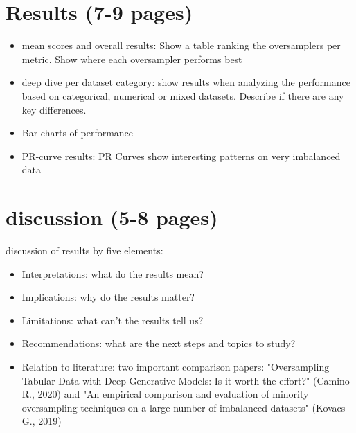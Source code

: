 \documentclass{article}
\begin{document}
\section{Results (7-9 pages)}
        \begin{itemize}
        \item mean scores and overall results: Show a table ranking the oversamplers per metric. Show where each oversampler performs best 
        \item deep dive per dataset category: show results when analyzing the performance based on categorical, numerical or mixed datasets. Describe if there are any key differences.
        \item Bar charts of performance 
        \item PR-curve results: PR Curves show interesting patterns on very imbalanced data 
    \end{itemize}
    
    
\section{discussion (5-8 pages)}
discussion of results by five elements:
    \begin{itemize}
        \item Interpretations: what do the results mean?
        \item Implications: why do the results matter?
        \item Limitations: what can’t the results tell us?
        \item Recommendations: what are the next steps and topics to study?
        \item Relation to literature: two important comparison papers: "Oversampling Tabular Data with Deep Generative Models: Is it worth the effort?" (Camino R., 2020) and "An empirical comparison and evaluation of minority oversampling techniques on a large number of imbalanced datasets" (Kovacs G., 2019)
    \end{itemize}
\end{document}
